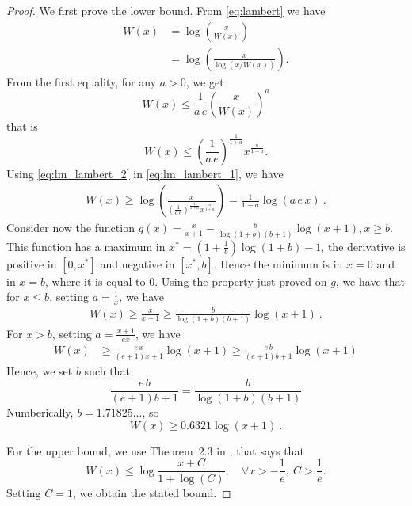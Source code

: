 \begin{proof}
We first prove the lower bound. From \eqref{eq:lambert} we have
\begin{align}
W(x) &= \log\left(\frac{x}{W(x)}\right) \label{eq:lm_lambert_1} \\
&= \log\left(\frac{x}{\log(x/W(x))}\right). \label{eq:lm_lambert_1b}
\end{align}
From the first equality, for any $a>0$, we get
\[
W(x) \leq \frac{1}{a\, e}\left(\frac{x}{W(x)}\right)^a
\]
that is
\begin{equation}
\label{eq:lm_lambert_2}
W(x) \leq \left(\frac{1}{a\, e}\right)^\frac{1}{1+a} x^\frac{a}{1+a}.
\end{equation}
Using \eqref{eq:lm_lambert_2} in \eqref{eq:lm_lambert_1}, we have
\begin{align*}
W(x) 
\geq \log\left(\frac{x}{\left(\frac{1}{a\, e}\right)^\frac{1}{1+a} x^\frac{a}{1+a}}\right) 
= \frac{1}{1+a}\log\left(a \, e\, x\right)~.
\end{align*}
Consider now the function $g(x)=\frac{x}{x+1} - \frac{b}{\log(1+b) (b+1)} \log(x+1), x\geq b$. This function has a maximum in $x^*=(1+\frac{1}{b}) \log(1+b)-1$, the derivative is positive in $[0,x^*]$ and negative in $[x^*,b]$. Hence the minimum is in $x=0$ and in $x=b$, where it is equal to $0$.
Using the property just proved on $g$, we have that for $x\leq b$, setting $a=\frac{1}{x}$, we have
\begin{align*}
W(x) 
\geq \frac{x}{x+1} \geq \frac{b}{\log(1+b) (b+1)} \log(x+1)~.
\end{align*}
For $x>b$, setting $a=\frac{x+1}{e x}$, we have
\begin{align}
W(x) 
&\geq \frac{e\,x}{(e+1) x + 1} \log(x+1) \geq \frac{e\,b}{(e+1) b + 1} \log(x+1)
\end{align}
Hence, we set $b$ such that 
\[
\frac{e\, b}{(e+1)b + 1} = \frac{b}{\log(1+b) (b+1)}
\]
Numberically, $b=1.71825...$, so
\[
W(x) \geq 0.6321 \log(x+1)~.
\]

For the upper bound, we use Theorem~2.3 in \cite{hoorfar2008inequalities}, that says that
\[
W(x) \leq \log\frac{x+C}{1+\log(C)}, \quad \forall x> -\frac{1}{e}, \ C>\frac{1}{e}.
\]
Setting $C=1$, we obtain the stated bound.
\end{proof}

